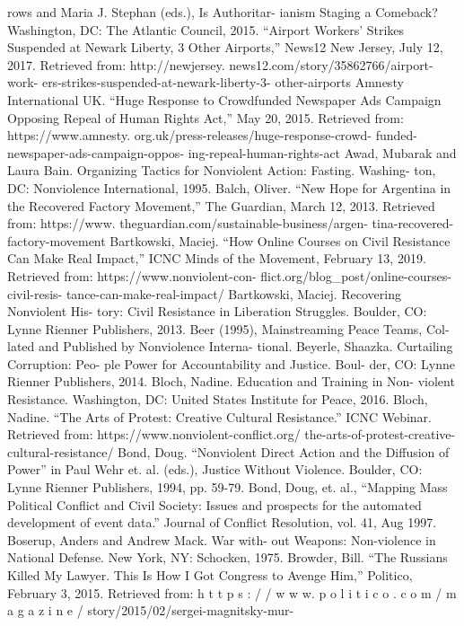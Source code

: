 \documentclass[twoside,a4paper,12pt,fleqn,openany]{extbook}
\begin{document}
rows and Maria J. Stephan (eds.), Is Authoritar-
ianism Staging a Comeback? Washington, DC:
The Atlantic Council, 2015.
“Airport Workers’ Strikes Suspended at Newark
Liberty, 3 Other Airports,” News12 New Jersey,
July 12, 2017. Retrieved from: http://newjersey.
news12.com/story/35862766/airport-work-
ers-strikes-suspended-at-newark-liberty-3-
other-airports
Amnesty International UK. “Huge Response to
Crowdfunded Newspaper Ads Campaign
Opposing Repeal of Human Rights Act,” May
20, 2015. Retrieved from: https://www.amnesty.
org.uk/press-releases/huge-response-crowd-
funded-newspaper-ads-campaign-oppos-
ing-repeal-human-rights-act
Awad, Mubarak and Laura Bain. Organizing
Tactics for Nonviolent Action: Fasting. Washing-
ton, DC: Nonviolence International, 1995.
Balch, Oliver. “New Hope for Argentina in the
Recovered Factory Movement,” The Guardian,
March 12, 2013. Retrieved from: https://www.
theguardian.com/sustainable-business/argen-
tina-recovered-factory-movement
Bartkowski, Maciej. “How Online Courses on
Civil Resistance Can Make Real Impact,” ICNC
Minds of the Movement, February 13, 2019.
Retrieved from: https://www.nonviolent-con-
flict.org/blog_post/online-courses-civil-resis-
tance-can-make-real-impact/
Bartkowski, Maciej. Recovering Nonviolent His-
tory: Civil Resistance in Liberation Struggles.
Boulder, CO: Lynne Rienner Publishers, 2013.
Beer (1995), Mainstreaming Peace Teams, Col-
lated and Published by Nonviolence Interna-
tional.
Beyerle, Shaazka. Curtailing Corruption: Peo-
ple Power for Accountability and Justice. Boul-
der, CO: Lynne Rienner Publishers, 2014.
Bloch, Nadine. Education and Training in Non-
violent Resistance. Washington, DC: United
States Institute for Peace, 2016.
Bloch, Nadine. “The Arts of Protest: Creative
Cultural Resistance.” ICNC Webinar. Retrieved
from: https://www.nonviolent-conflict.org/
the-arts-of-protest-creative-cultural-resistance/
Bond, Doug. “Nonviolent Direct Action and the
Diffusion of Power” in Paul Wehr et. al. (eds.),
Justice Without Violence. Boulder, CO: Lynne
Rienner Publishers, 1994, pp. 59-79.
Bond, Doug, et. al., “Mapping Mass Political
Conflict and Civil Society: Issues and prospects
for the automated development of event data.”
Journal of Conflict Resolution, vol. 41, Aug 1997.
Boserup, Anders and Andrew Mack. War with-
out Weapons: Non-violence in National
Defense. New York, NY: Schocken, 1975.
Browder, Bill. “The Russians Killed My Lawyer.
This Is How I Got Congress to Avenge Him,”
Politico, February 3, 2015. Retrieved from:
h t t p s : / / w w w. p o l i t i c o . c o m / m a g a z i n e /
story/2015/02/sergei-magnitsky-mur-
\end{document}
